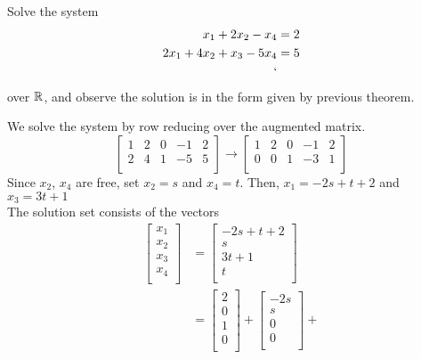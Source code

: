 \documentclass{article}
\begin{document}
\begin{example}
  Solve the system
  \begin{align*}
    x_1 + 2x_2 - x_4 &= 2\\
    2x_1 + 4x_2 +x_3 -5x_4 &= 5\\`
  \end{align*}
  over $\mathbb{R}$, and observe the solution is in the form given by previous theorem.

  We solve the system by row reducing over the augmented matrix.
  \[
    \begin{bmatrix}
      1 & 2 & 0 & -1 & 2\\
      2 & 4 & 1 & -5 & 5\\
    \end{bmatrix} \to
    \begin{bmatrix}
      1 & 2 & 0 & -1 & 2\\
      0 & 0 & 1 & -3 & 1\\
    \end{bmatrix}
  \]
  Since $x_2$, $x_4$ are free, set $x_2 = s$ and $x_4 = t$. Then, $x_1 = -2s+t+2$ and $x_3 = 3t+1$\\
  The solution set consists of the vectors
  \begin{align*}
    \begin{bmatrix}
      x_1\\
      x_2\\
      x_3\\
      x_4\\
    \end{bmatrix}
    &=
    \begin{bmatrix}
      -2s + t + 2\\
      s\\
      3t+1\\
      t\\
    \end{bmatrix}\\
    &=
    \begin{bmatrix}
      2\\
      0\\
      1\\
      0\\
    \end{bmatrix} +
    \begin{bmatrix}
      -2s\\
      s\\
      0\\
      0\\
    \end{bmatrix} +

\end{align*}
\end{example}
\end{document}
